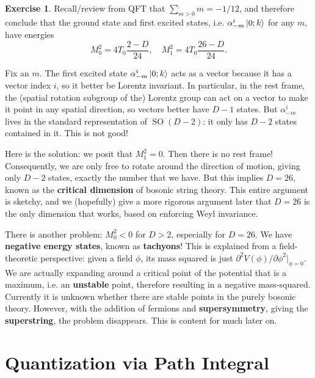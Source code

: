 \documentclass{report}
\theoremstyle{plain}
\theoremstyle{definition}
\newtheorem{exercise}{Exercise}[section]
\theoremstyle{remark}
\newcommand{\di}{\partial}
\DeclareMathOperator{\SO}{SO}
\begin{document}
\begin{exercise}
  Recall/review from QFT that $\sum_{m > 0} m = -1/12$, and therefore
  conclude that the ground state and first excited states, i.e.
  $\alpha_{-m}^i\ket{0; k}$ for any $m$, have energies
  \[ M_0^2 = 4T_0\frac{2-D}{24}, \quad M_1^2 = 4T_0\frac{26-D}{24}. \]
\end{exercise}

Fix an $m$. The first excited state $\alpha_{-m}^i\ket{0; k}$ acts as
a vector because it has a vector index $i$, so it better be Lorentz
invariant. In particular, in the rest frame, the (spatial rotation
subgroup of the) Lorentz group can act on a vector to make it point in
any spatial direction, so vectors better have $D-1$ states. But
$\alpha_{-m}^i$ lives in the standard representation of $\SO(D-2)$: it
only has $D-2$ states contained in it. This is not good!

Here is the solution: we posit that $M_1^2 = 0$. Then there is no rest
frame! Consequently, we are only free to rotate around the direction
of motion, giving only $D-2$ states, exactly the number that we have.
But this implies $D = 26$, known as the {\bf critical dimension} of
bosonic string theory. This entire argument is sketchy, and we
(hopefully) give a more rigorous argument later that $D = 26$ is the
only dimension that works, based on enforcing Weyl invariance.

There is another problem: $M_0^2 < 0$ for $D > 2$, especially for $D =
26$. We have {\bf negative energy states}, known as {\bf tachyons}!
This is explained from a field-theoretic perspective: given a field
$\phi$, its mass squared is just $\di^2 V(\phi)/\di \phi^2|_{\phi=0}$.
We are actually expanding around a critical point of the potential
that is a maximum, i.e. an {\bf unstable} point, therefore resulting
in a negative mass-squared. Currently it is unknown whether there are
stable points in the purely bosonic theory. However, with the addition
of fermions and {\bf supersymmetry}, giving the {\bf superstring}, the
problem disappears. This is content for much later on.

\section{Quantization via Path Integral}
\end{document}
